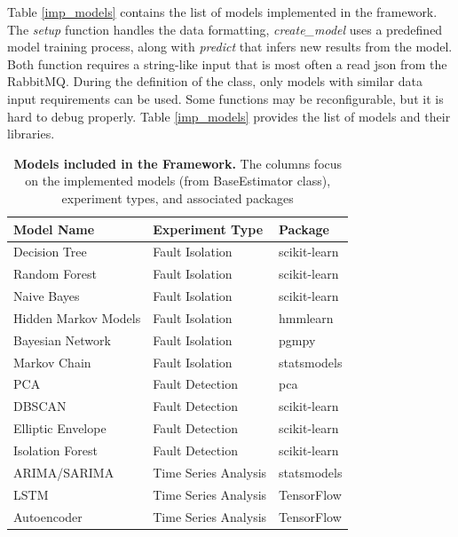 \documentclass[preprint,12pt, a4paper]{elsarticle}
\begin{document}
Table \ref{imp_models} contains the list of models implemented in the framework. The \textit{setup} function handles the data formatting, \textit{create\_model} uses a predefined model training process, along with \textit{predict} that infers new results from the model. Both function requires a string-like input that is most often a read json from the RabbitMQ. During the definition of the class, only models with similar data input requirements can be used. Some functions may be reconfigurable, but it is hard to debug properly. Table \ref{imp_models} provides the list of models and their libraries.
\begin{table}[h!]
\caption{\textbf{Models included in the Framework.} The columns focus on the implemented models (from BaseEstimator class), experiment types, and associated packages}
\centering
\small %
\begin{tabular}{|l|l|l|}
\hline
\textbf{Model Name} & \textbf{Experiment Type} & \textbf{Package} \\
\hline
Decision Tree & Fault Isolation & scikit-learn \citep{scikit-learn} \\
\hline
Random Forest & Fault Isolation & scikit-learn \citep{scikit-learn} \\
\hline
Naive Bayes & Fault Isolation & scikit-learn \citep{scikit-learn} \\
\hline
Hidden Markov Models & Fault Isolation & hmmlearn \citep{hmmlearn} \\
\hline
Bayesian Network & Fault Isolation & pgmpy \citep{Ankan2015} \\
\hline
Markov Chain & Fault Isolation & statsmodels \citep{seabold2010statsmodels} \\
\hline
PCA & Fault Detection & pca \citep{Taskesen_pca_A_Python_2020} \\
\hline
DBSCAN & Fault Detection & scikit-learn \citep{scikit-learn} \\
\hline
Elliptic Envelope & Fault Detection & scikit-learn \citep{scikit-learn} \\
\hline
Isolation Forest & Fault Detection & scikit-learn \citep{scikit-learn} \\
\hline
ARIMA/SARIMA & Time Series Analysis & statsmodels \citep{scikit-learn} \\
\hline
LSTM & Time Series Analysis & TensorFlow \citep{tensorflow2015-whitepaper} \\
\hline
Autoencoder & Time Series Analysis & TensorFlow \citep{tensorflow2015-whitepaper} \\

\end{tabular}
\end{table}
\end{document}
